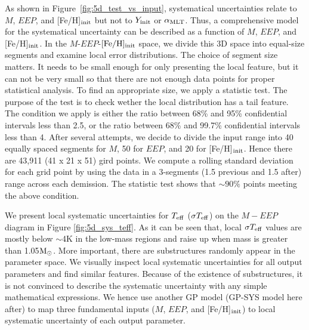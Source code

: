 As shown in Figure~\ref{fig:5d_test_vs_input}, systematical uncertainties relate to $M$, $EEP$, and [Fe/H]$_{\rm init}$ but not to $Y_{\rm init}$ or $\alpha_{\rm MLT}$.  Thus, a comprehensive model for the systematical uncertainty can be described as a function of $M$, $EEP$, and [Fe/H]$_{\rm init}$. In the $M$-$EEP$-$\rm [Fe/H]_{init}$ space, we divide this 3D space into equal-size segments and examine local error distributions. 
The choice of segment size matters. It needs to be small enough for only presenting the local feature, but it can not be very small so that there are not enough data points for proper statistical analysis. 
%
To find an appropriate size, we apply a statistic test. The purpose of the test is to check wether the local distribution has a tail feature. The condition we apply is either the ratio between 68\% and 95\% confidential intervals less than 2.5, or the ratio between 68\% and 99.7\% confidential intervals less than 4. 
%
After several attempts, we decide to divide the input range into 40 equally spaced segments for $M$, 50 for $EEP$, and 20 for [Fe/H]$_{\rm init}$. Hence there are 43,911 (41 x 21 x 51) gird points. We compute a rolling standard deviation for each grid point by using the data in a 3-segments (1.5 previous and 1.5 after) range across each demission. The statistic test shows that $\sim 90\%$ points meeting the above condition. 

We present local systematic uncertainties for $T_{\rm eff}$ ($\sigma T_{\rm eff}$) on the $M-EEP$ diagram in Figure \ref{fig:5d_sys_teff}. As it can be seen that, local $\sigma T_{\rm eff}$ values are mostly below $\sim$4K in the low-mass regions and raise up when mass is greater than 1.05$\rm M_{\odot}$. More important, there are substructures randomly appear in the parameter space. 
We visually inspect local systematic uncertainties for all output parameters and find similar features. 
Because of the existence of substructures, it is not convinced to describe the systematic uncertainty with any simple mathematical expressions. We hence use another GP model (GP-SYS model here after) to map three fundamental inputs ($M$, $EEP$, and [Fe/H]$_{\rm init}$) to local systematic uncertainty of each output parameter.   

